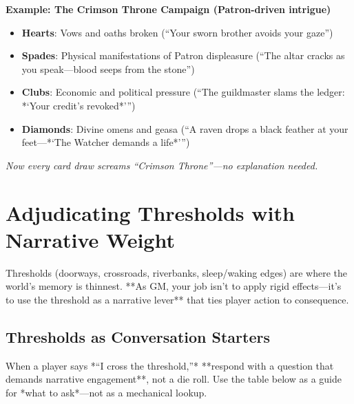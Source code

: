 \textbf{Example: The Crimson Throne Campaign (Patron-driven intrigue)}
\begin{itemize}
  \item \textbf{Hearts}: Vows and oaths broken (``Your sworn brother avoids your gaze'') 
  \item \textbf{Spades}: Physical manifestations of Patron displeasure (``The altar cracks as you speak---blood seeps from the stone'') 
  \item \textbf{Clubs}: Economic and political pressure (``The guildmaster slams the ledger: *`Your credit's revoked*''') 
  \item \textbf{Diamonds}: Divine omens and geasa (``A raven drops a black feather at your feet---*`The Watcher demands a life*''') 
\end{itemize}
\textit{Now every card draw screams ``Crimson Throne''---no explanation needed.}

\section{Adjudicating Thresholds with Narrative Weight}
\label{sec:thresholds-advanced}

Thresholds (doorways, crossroads, riverbanks, sleep/waking edges) are where the world's memory is thinnest. **As GM, your job isn't to apply rigid effects---it's to use the threshold as a narrative lever** that ties player action to consequence.

\subsection*{Thresholds as Conversation Starters}
When a player says *``I cross the threshold,''* **respond with a question that demands narrative engagement**, not a die roll. Use the table below as a guide for *what to ask*---not as a mechanical lookup.

